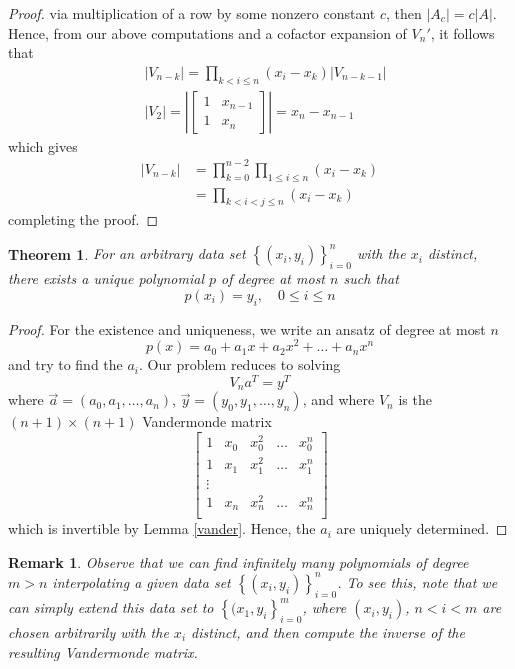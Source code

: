 \documentclass[12pt,reqno]{amsart}
\numberwithin{equation}{section}  %
\newtheorem{theorem}{Theorem}
\newtheorem*{remark}{Remark}
\begin{document}
\begin{proof}
via multiplication of a row by some nonzero constant $c$, then
$|A_c| = c |A|$. Hence, from our above computations and a cofactor expansion
of $V_n'$, it follows that 
\begin{align*}
& |V_{n-k}| = \prod_{k < i \le n} (x_i - x_k) |V_{n-k-1}|\\
& | V_2 | = \left |
\begin{bmatrix}
1 & x_{n-1} \\
1 & x_{n}
\end{bmatrix}
\right | = x_n - x_{n-1}
\end{align*}
which gives
\begin{align*}
|V_{n-k}| & = \prod_{k=0}^{n-2} \prod_{1 \le i \le n} (x_i - x_k)\\
& = \prod_{k < i < j \le n} (x_i - x_k)
\end{align*}
completing the proof.
\end{proof}
\begin{theorem}
For an arbitrary data set $ \left\{ (x_i, y_i) \right\}_{i = 0}^{n}$ with the $x_i$
distinct, there
exists a unique polynomial $p$ of degree at most $n$ such that
\begin{equation*}
p(x_i) = y_i, \quad 0 \le i \le n
\end{equation*}
\end{theorem}
\begin{proof}
For the existence and uniqueness, we write an ansatz of degree at most $n$
\begin{equation*}
p(x) = a_0 + a_1x + a_2x^2 + \ldots + a_nx^n
\end{equation*}
and try to find the $a_i$. 
Our problem reduces to solving
\begin{equation*}
V_n a^{T} = y^{T}
\end{equation*}
where $\vec{a} = (a_0, a_1, \ldots, a_n)$, $\vec{y} = (y_0, y_1, \ldots, y_n)$,
and where $V_n$ is the $(n+1) \times (n+1)$ Vandermonde matrix
\begin{equation*}
\begin{bmatrix}
1 & x_0 & x_0^{2} & \ldots & x_0^{n} \\
1 & x_1 & x_1^{2} & \ldots & x_1^{n} \\
\vdots \\
1 & x_n & x_n^{2} & \ldots & x_n^{n} \\
\end{bmatrix}
\end{equation*}
which is invertible by Lemma \ref{vander}. Hence, the $a_i$ are uniquely determined.
\end{proof}
\begin{remark}
Observe that we can find infinitely many polynomials of degree $m > n$
interpolating a given data set $\left\{ (x_i, y_i) \right\}_{i=0}^n$. To see
this, note that we can simply extend this data set to $ \left\{ (x_1, y_i
\right\}_{i=0}^m$, where $(x_i, y_i)$, $n < i < m$ are chosen arbitrarily with
the $x_i$ distinct, and then compute the inverse of the resulting Vandermonde
matrix.
\end{remark}
\end{document}
